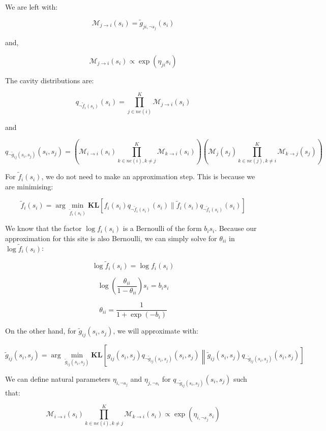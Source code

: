 \documentclass[12pt]{article}
\begin{document}
We are left with:

\[\mathcal{M}_{j \rightarrow i}(s_i) = \tilde{g}_{ji, \neg s_j}(s_i)\]

and,

\[\mathcal{M}_{j \rightarrow i}(s_i) \propto \exp\left(\eta_{ji} s_i\right)\]



The cavity distributions are:

\[q_{\neg \tilde{f}_i(s_i)}(s_i) =
\prod_{j\in ne(i)}^{K} \mathcal{M}_{j \rightarrow i}(s_i)
\]

and

\[q_{\neg \tilde{g}_{ij}(s_i, s_j)}(s_i, s_j) = \left( \mathcal{M}_{i \rightarrow i}(s_i) \prod_{k\in ne(i), k\neq j}^{K} \mathcal{M}_{k \rightarrow i}(s_i)
\right)\left( \mathcal{M}_{j}(s_j) \prod_{k\in ne(j), k\neq i}^{K} \mathcal{M}_{k \rightarrow j}(s_j)
\right)
\]

For $\tilde{f}_{i}(s_{i})$, we do not need to make an approximation step.
This is because we are minimising:

\[\tilde{f}_{i}(s_{i}) = \arg \min_{\tilde{f}_{i}(s_{i})} \textbf{KL} \left[ f_{i}(s_{i}) q_{\neg \tilde{f}_i(s_i)}(s_i) \| \tilde{f}_{i}(s_{i}) q_{\neg \tilde{f}_i(s_i)}(s_i) \right]\]

We know that the factor $\log f_i(s_i)$ is a Bernoulli of the form $b_i s_i$. Because our approximation for this site is also Bernoulli, we can simply solve for $\theta_{ii}$ in $\log \tilde{f}_{i}(s_{i})$:

\[\log \tilde{f}_i(s_i) = \log f_{i}(s_{i})\]


\[\log \left(\frac{\theta_{ii}}{1-\theta_{ii}} \right)s_i = b_i s_i\]

\[\theta_{ii} = \frac{1}{1+\exp(-b_i)}\]

On the other hand, for $\tilde{g}_{ij}(s_i, s_j)$, we will approximate with:

\[\tilde{g}_{ij}(s_i, s_j) = \arg \min_{\tilde{g}_{ij}(s_i, s_j)} \textbf{KL} \left[ g_{ij}(s_i, s_j) q_{\neg \tilde{g}_{ij}(s_i, s_j)}(s_i, s_j) \left\| \tilde{g}_{ij}(s_i, s_j) q_{\neg \tilde{g}_{ij}(s_i, s_j)}(s_i, s_j) \right]\]

We can define natural parameters $\eta_{i, \neg s_j}$ and $\eta_{j, \neg s_i}$ for $q_{\neg \tilde{g}_{ij}(s_i, s_j)}(s_i, s_j)$ such that:

\[\mathcal{M}_{i \rightarrow i}(s_i) \prod_{k\in ne(i), k\neq j}^{K} \mathcal{M}_{k \rightarrow i}(s_i) \propto \exp(\eta_{i, \neg s_j} s_i)\]
\end{document}
